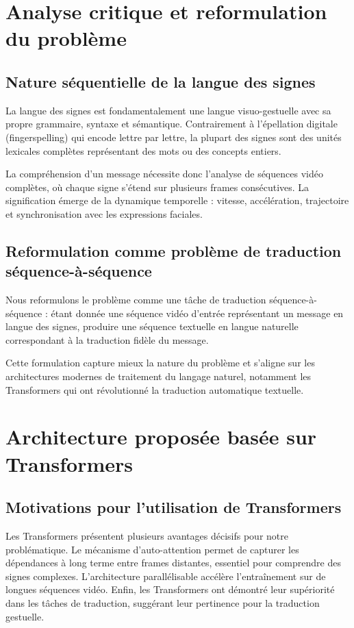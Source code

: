 \documentclass[twocolumn]{el-author}
\begin{document}
\section{Analyse critique et reformulation du problème}

\subsection{Nature séquentielle de la langue des signes}

La langue des signes est fondamentalement une langue visuo-gestuelle avec sa propre grammaire, syntaxe et sémantique. Contrairement à l'épellation digitale (fingerspelling) qui encode lettre par lettre, la plupart des signes sont des unités lexicales complètes représentant des mots ou des concepts entiers.

La compréhension d'un message nécessite donc l'analyse de séquences vidéo complètes, où chaque signe s'étend sur plusieurs frames consécutives. La signification émerge de la dynamique temporelle : vitesse, accélération, trajectoire et synchronisation avec les expressions faciales.

\subsection{Reformulation comme problème de traduction séquence-à-séquence}

Nous reformulons le problème comme une tâche de traduction séquence-à-séquence : étant donnée une séquence vidéo d'entrée représentant un message en langue des signes, produire une séquence textuelle en langue naturelle correspondant à la traduction fidèle du message.

Cette formulation capture mieux la nature du problème et s'aligne sur les architectures modernes de traitement du langage naturel, notamment les Transformers qui ont révolutionné la traduction automatique textuelle.

\section{Architecture proposée basée sur Transformers}

\subsection{Motivations pour l'utilisation de Transformers}

Les Transformers présentent plusieurs avantages décisifs pour notre problématique. Le mécanisme d'auto-attention permet de capturer les dépendances à long terme entre frames distantes, essentiel pour comprendre des signes complexes. L'architecture parallélisable accélère l'entraînement sur de longues séquences vidéo. Enfin, les Transformers ont démontré leur supériorité dans les tâches de traduction, suggérant leur pertinence pour la traduction gestuelle.
\end{document}
